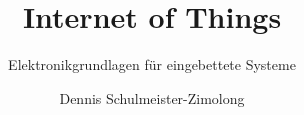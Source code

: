 \title{Internet of Things}
\subtitle{Elektronikgrundlagen für eingebettete Systeme}
\author{Dennis Schulmeister-Zimolong}

\renewcommand{\ubInstitute}{Studiengang Wirtschaftsinformatik}
\renewcommand{\ubModule}{IoT -- Technical Point of View}
\renewcommand{\ubType}{Aufgaben}
